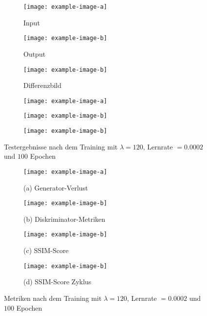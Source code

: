 \begin{figure}
  \begin{subfigure}[t]{.3\textwidth}
    \centering
    \caption{Input}
    \texttt{[image: example-image-a]}
  \end{subfigure}
  \hfill
  \begin{subfigure}[t]{.3\textwidth}
    \centering
    \caption{Output}
    \texttt{[image: example-image-b]}
  \end{subfigure}
  \hfill
  \begin{subfigure}[t]{.3\textwidth}
    \centering
    \caption{Differenzbild}
    \texttt{[image: example-image-b]}
  \end{subfigure}

  \medskip

  \begin{subfigure}[t]{.3\textwidth}
    \centering
    \texttt{[image: example-image-a]}
  \end{subfigure}
  \hfill
  \begin{subfigure}[t]{.3\textwidth}
    \centering
    \texttt{[image: example-image-b]}
  \end{subfigure}
  \hfill
  \begin{subfigure}[t]{.3\textwidth}
    \centering
    \texttt{[image: example-image-b]}
  \end{subfigure}
  \caption{Testergebnisse nach dem Training mit $\lambda=120$, Lernrate $=0.0002$ und $100$ Epochen}
  \label{evaluation:cycleGan_Testergebnisse}
\end{figure}

\begin{figure}
  \begin{subfigure}[t]{.24\textwidth}
    \centering
    \texttt{[image: example-image-a]}
    \caption{(a) Generator-Verlust}
  \end{subfigure}
  \begin{subfigure}[t]{.24\textwidth}
    \centering
    \texttt{[image: example-image-b]}
    \caption{(b) Diskriminator-Metriken}
  \end{subfigure}
  \begin{subfigure}[t]{.24\textwidth}
    \centering
    \texttt{[image: example-image-b]}
    \caption{(c) SSIM-Score}
  \end{subfigure}
  \begin{subfigure}[t]{.24\textwidth}
    \centering
    \texttt{[image: example-image-b]}
    \caption{(d) SSIM-Score Zyklus}
  \end{subfigure}

  \caption{Metriken nach dem Training mit $\lambda=120$, Lernrate $=0.0002$ und $100$ Epochen}
  \label{evaluation:cycleGan_Metriken}
\end{figure}


